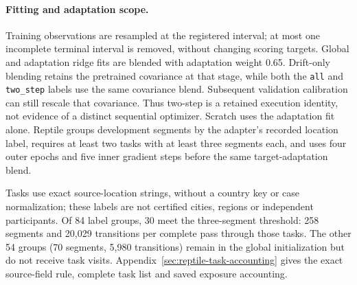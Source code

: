 \FloatBarrier
\paragraph{Fitting and adaptation scope.}
Training observations are resampled at the registered interval; at most one
incomplete terminal interval is removed, without changing scoring targets.
Global and adaptation ridge fits are blended with adaptation weight 0.65.
Drift-only blending retains the pretrained covariance at that stage, while
both the \texttt{all} and \texttt{two\_step} labels use the same covariance
blend. Subsequent validation calibration can still rescale that covariance.
Thus two-step is a retained execution identity, not evidence of a distinct
sequential optimizer. Scratch uses the adaptation fit alone. Reptile groups
development segments by the adapter's recorded location label, requires at least two tasks with
at least three segments each, and uses four outer epochs and five inner
gradient steps before the same target-adaptation blend.

Tasks use exact source-location strings, without a country key or case
normalization; these labels are not certified cities, regions or independent
participants. Of 84 label groups, 30 meet the three-segment threshold:
258 segments and 20,029 transitions per complete pass through those tasks.
The other 54 groups (70 segments, 5,980 transitions) remain in the global
initialization but do not receive task visits. Appendix~\ref{sec:reptile-task-accounting}
gives the exact source-field rule, complete task list and saved exposure accounting.

